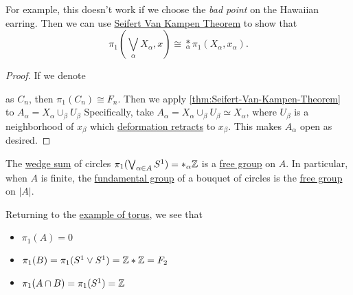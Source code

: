 \begin{eg}
\begin{enumerate}
\begin{exercise}
			      \par For example, this doesn't work if we choose the \emph{bad point} on the Hawaiian earring. Then we can use \hyperref[thm:Seifert-Van-Kampen-Theorem]{Seifert Van Kampen Theorem}
			      to show that
			      \[
				      \pi _1\left(\bigvee_\alpha X_\alpha , x\right) \cong \underset{\alpha }{\ast}\pi _1\left(X_\alpha , x_\alpha \right).
			      \]
			      \begin{proof}
				      If we denote
				      \begin{figure}[H]
					      \centering
					      \label{fig:eg-2:Seifert-Van-Kampen-Theorem}
				      \end{figure}
				      as \(C_n\), then \(\pi _1(C_n)\cong F_n\). Then we apply \autoref{thm:Seifert-Van-Kampen-Theorem} to \(A_\alpha = X_\alpha \cup_{\beta }U_\beta \)
				      Specifically, take \(A_\alpha = X_\alpha \cup_\beta U_\beta \simeq X_\alpha \), where \(U_\beta \) is a neighborhood of \(x_\beta \) which
				      \hyperref[def:deformation-retraction]{deformation retracts} to \(x_\beta \). This makes \(A_\alpha \) open as desired.
			      \end{proof}
		      \end{exercise}

		      \begin{corollary}
			      The \hyperref[sssec-Wedge-sum]{wedge sum} of circles \(\pi _1(\bigvee_{\alpha \in A}S^1) = \ast_\alpha \mathbb{\MakeUppercase{z}} \) is a \hyperref[def:free-group]{free group} on \(A\).
			      In particular, when \(A\) is finite, the \hyperref[def:fundamental-group]{fundamental group} of a bouquet of circles is the \hyperref[def:free-group]{free group}
			      on \(\left\vert A \right\vert \).
		      \end{corollary}

		      \hr
		      Returning to the \hyperref[lec11:eg:torus]{example of torus}, we see that
		      \begin{itemize}
			      \item \(\pi _1(A) = 0\)
			      \item \(\pi _1(B) = \pi _1(S^1\vee S^1) = \mathbb{\MakeUppercase{z}} \ast \mathbb{\MakeUppercase{z}}  = F_2\)
			      \item \(\pi _1(A\cap B) = \pi _1(S^1) = \mathbb{\MakeUppercase{z}} \)
		      \end{itemize}


\end{enumerate}
\end{eg}
